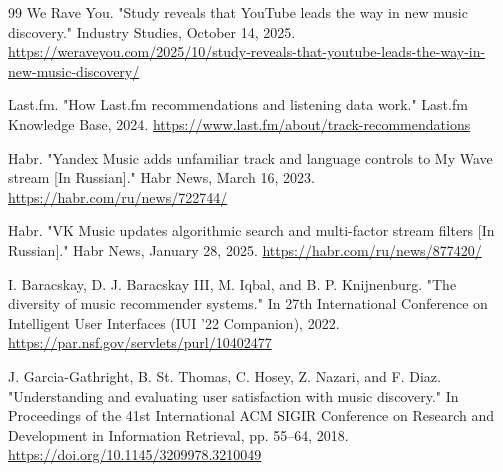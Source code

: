 \begin{thebibliography}{99}
  We Rave You.
  "Study reveals that YouTube leads the way in new music discovery."
  Industry Studies, October 14, 2025. \url{https://weraveyou.com/2025/10/study-reveals-that-youtube-leads-the-way-in-new-music-discovery/}

  Last.fm.
  "How Last.fm recommendations and listening data work."
  Last.fm Knowledge Base, 2024. \url{https://www.last.fm/about/track-recommendations}

  Habr.
  "Yandex Music adds unfamiliar track and language controls to My Wave stream [In Russian]."
  Habr News, March 16, 2023. \url{https://habr.com/ru/news/722744/}

  Habr.
  "VK Music updates algorithmic search and multi-factor stream filters [In Russian]."
  Habr News, January 28, 2025. \url{https://habr.com/ru/news/877420/}

  I. Baracskay, D. J. Baracskay III, M. Iqbal, and B. P. Knijnenburg.
  "The diversity of music recommender systems."
  In 27th International Conference on Intelligent User Interfaces (IUI '22 Companion), 2022. \url{https://par.nsf.gov/servlets/purl/10402477}

  J. Garcia-Gathright, B. St. Thomas, C. Hosey, Z. Nazari, and F. Diaz.
  "Understanding and evaluating user satisfaction with music discovery."
  In Proceedings of the 41st International ACM SIGIR Conference on Research and Development in Information Retrieval, pp. 55--64, 2018. \url{https://doi.org/10.1145/3209978.3210049}

\end{thebibliography}
